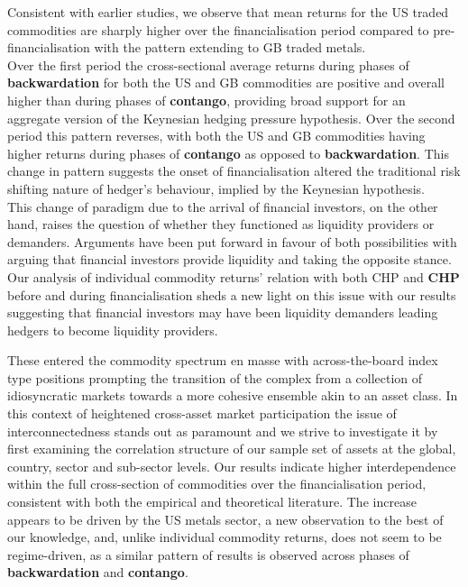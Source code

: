 \documentclass[
  authoryear,
  preprint,
  3p]{elsarticle}
\begin{document}
\bigskip
\bigskip

Consistent with earlier studies, we observe that mean returns for the US
traded commodities are sharply higher over the financialisation period
compared to pre-financialisation with the pattern extending to GB traded
metals.\\
Over the first period the cross-sectional average returns during phases
of \textbf{backwardation} for both the US and GB commodities are
positive and overall higher than during phases of \textbf{contango},
providing broad support for an aggregate version of the Keynesian
hedging pressure hypothesis. Over the second period this pattern
reverses, with both the US and GB commodities having higher returns
during phases of \textbf{contango} as opposed to \textbf{backwardation}.
This change in pattern suggests the onset of financialisation altered
the traditional risk shifting nature of hedger's behaviour, implied by
the Keynesian hypothesis.\\
This change of paradigm due to the arrival of financial investors, on
the other hand, raises the question of whether they functioned as
liquidity providers or demanders. Arguments have been put forward in
favour of both possibilities with \citet{moskowitz_time_2012} arguing
that financial investors provide liquidity and \citet{kang_tale_2020}
taking the opposite stance. Our analysis of individual commodity
returns' relation with both CHP and \textbf{CHP} before and during
financialisation sheds a new light on this issue with our results
suggesting that financial investors may have been liquidity demanders
leading hedgers to become liquidity providers.

\medskip

These entered the commodity spectrum en masse with across-the-board
index type positions prompting the transition of the complex from a
collection of idiosyncratic markets towards a more cohesive ensemble
akin to an asset class. In this context of heightened cross-asset market
participation the issue of interconnectedness stands out as paramount
and we strive to investigate it by first examining the correlation
structure of our sample set of assets at the global, country, sector and
sub-sector levels. Our results indicate higher interdependence within
the full cross-section of commodities over the financialisation period,
consistent with both the empirical and theoretical literature. The
increase appears to be driven by the US metals sector, a new observation
to the best of our knowledge, and, unlike individual commodity returns,
does not seem to be regime-driven, as a similar pattern of results is
observed across phases of \textbf{backwardation} and \textbf{contango}.
\end{document}
